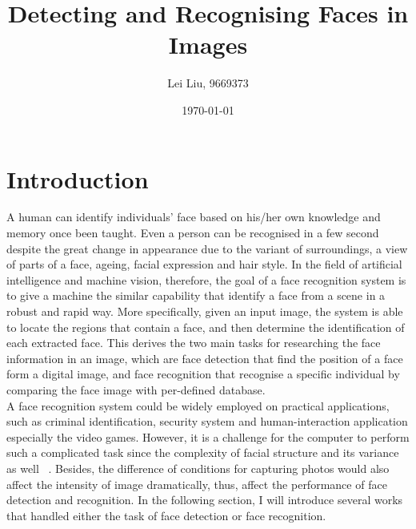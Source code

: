 \documentclass[12pt, a4paper, twoside]{article}
\begin{document}
\title{Detecting and Recognising Faces in Images}
\date{\today}
\author{Lei Liu, 9669373}
\maketitle


\section{Introduction}
A human can identify individuals' face based on his/her own knowledge and memory once been taught. Even a person can be recognised in a few second despite the great change in appearance due to the variant of surroundings, a view of parts of a face, ageing, facial expression and hair style. In the field of artificial intelligence and machine vision, therefore, the goal of a face recognition system is to give a machine the similar capability that identify a face from a scene in a robust and rapid way. More specifically, given an input image, the system is able to locate the regions that contain a face, and then determine the identification of each extracted face. This derives the two main tasks for researching the face information in an image, which are face detection that find the position of a face form a digital image, and face recognition that recognise a specific individual by comparing the face image with per-defined database.\\
A face recognition system could be widely employed on practical applications, such as criminal identification, security system and human-interaction application especially the video games. However, it is a challenge for the computer to perform such a complicated task since the complexity of facial structure and its variance as well ~\cite{turk1991eigenfaces}. Besides, the difference of conditions for capturing photos would also affect the intensity of image dramatically, thus, affect the performance of face detection and recognition. In the following section, I will introduce several works that handled either the task of face detection or face recognition.


\end{document}
